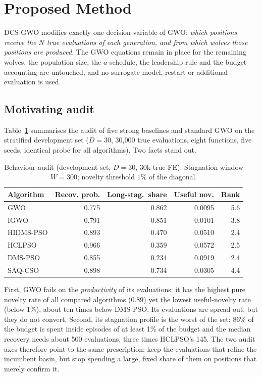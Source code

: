 \documentclass[journal]{IEEEtran}
\newcommand{\method}{DCS-GWO}
\begin{document}
\section{Proposed Method}
\label{sec:method}
\method{} modifies exactly one decision variable of GWO: \emph{which
positions receive the $N$ true evaluations of each generation, and from which
wolves those positions are produced}. The GWO equations remain in place for
the remaining wolves, the population size, the $a$-schedule, the leadership
rule and the budget accounting are untouched, and no surrogate model,
restart or additional evaluation is used.

\subsection{Motivating audit}
\label{sec:audit}
Table~\ref{tab:audit} summarises the audit of five strong baselines and
standard GWO on the stratified development set ($D=30$, 30{,}000 true
evaluations, eight functions, five seeds, identical probe for all
algorithms). Two facts stand out.
\begin{table}[t]
\centering
\caption{Behaviour audit (development set, $D=30$, 30k true FE). Stagnation
window $W=300$; novelty threshold $1\%$ of the diagonal.}
\label{tab:audit}
\begin{tabular}{lrrrr}
\toprule
Algorithm & Recov. prob. & Long-stag.\ share & Useful nov. & Rank \\
\midrule
GWO           & 0.775 & 0.862 & 0.0095 & 5.6 \\
IGWO \cite{nadimi2021igwo}    & 0.791 & 0.851 & 0.0101 & 3.8 \\
HIDMS-PSO \cite{varna2020hidms}     & 0.893 & 0.470 & 0.0510 & 2.4 \\
HCLPSO \cite{lynn2015hclpso}      & 0.966 & 0.359 & 0.0572 & 2.5 \\
DMS-PSO \cite{liang2005dms}       & 0.855 & 0.234 & 0.0919 & 2.4 \\
SAQ-CSO       & 0.898 & 0.734 & 0.0305 & 4.4 \\
\bottomrule
\end{tabular}
\end{table}
First, GWO fails on the \emph{productivity} of its evaluations: it has the
highest pure novelty rate of all compared algorithms (0.89) yet the lowest
useful-novelty rate (below 1\%), about ten times below DMS-PSO. Its
evaluations are spread out, but they do not convert. Second, its stagnation
profile is the worst of the set: 86\% of the budget is spent inside episodes
of at least 1\% of the budget and the median recovery needs about 500
evaluations, three times HCLPSO's 145. The two audit axes therefore point to
the same prescription: keep the evaluations that refine the incumbent basin,
but stop spending a large, fixed share of them on positions that merely
confirm it.
\end{document}
